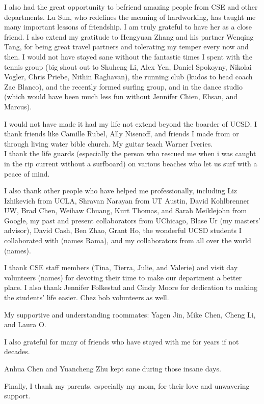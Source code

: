 \documentclass[12pt]{ucsddissertation}
\begin{document}
\begin{acknowledgements}
I also had the great opportunity to befriend amazing people from CSE and other departments. Lu Sun, who redefines the meaning of hardworking, has taught me many important lessons of friendship. I am truly grateful to have her as a close friend. I also extend my gratitude to Hengyuan Zhang and his partner Wenqing Tang, for being great travel partners and tolerating my temper every now and then. I would not have stayed sane without the fantastic times I spent with the tennis group (big shout out to Shuheng Li, Alex Yen, Daniel Spokoyny, Nikolai Vogler, Chris Priebe, Nithin Raghavan), the running club (kudos to head coach Zac Blanco), and the recently formed surfing group, and in the dance studio (which would have been much less fun without Jennifer Chien, Ehsan, and Marcus).

I would not have made it had my life not extend beyond the boarder of UCSD. I thank friends like Camille Rubel, Ally Nisenoff, and friends I made from or through living water bible church. My guitar teach Warner Iveries. \\

I thank the life guards (especially the person who rescued me when i was caught in the rip current without a surfboard) on various beaches who let us surf with a peace of mind.

I also thank other people who have helped me professionally, including Liz Izhikevich from UCLA, Shravan Narayan from UT Austin, David Kohlbrenner UW, Brad Chen, Weihaw Chuang, Kurt Thomas, and Sarah Meiklejohn from Google, my past and present collaborators from UChicago, Blase Ur (my masters' advisor), David Cash, Ben Zhao, Grant Ho, the wonderful UCSD students I collaborated with (names Rama), and my collaborators from all over the world (names).

I thank CSE staff members (Tina, Tierra, Julie, and Valerie) and visit day volunteers (names) for devoting their time to make our department a better place. I also thank Jennifer Folkestad and Cindy Moore for dedication to making the students' life easier. Chez bob volunteers as well.

My supportive and understanding roommates: Yagen Jin, Mike Chen, Cheng Li, and Laura O. 

I also grateful for many of friends who have stayed with me for years if not decades.

Anhua Chen and Yuancheng Zhu kept sane during those insane days.

Finally, I thank my parents, especially my mom, for their love and unwavering support.



\end{acknowledgements}
\end{document}
